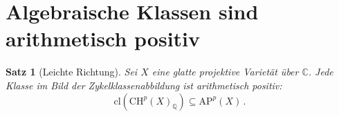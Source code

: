 \documentclass[aps,prd,twocolumn,superscriptaddress,nofootinbib]{revtex4-2}
\newtheorem{theorem}{Satz}[section]
\theoremstyle{definition}
\theoremstyle{remark}
\begin{document}
\section{Algebraische Klassen sind arithmetisch positiv}
\label{sec:easy_direction}

\begin{theorem}[Leichte Richtung]
\label{thm:easy_direction}
Sei $X$ eine glatte projektive Varietät über $\mathbb{C}$. Jede Klasse im Bild der Zykelklassenabbildung ist arithmetisch positiv:
\begin{equation}
\mathrm{cl}\!\left(\mathrm{CH}^p(X)_\mathbb{Q}\right) \subseteq \mathrm{AP}^p(X)\,.
\end{equation}
\end{theorem}
\end{document}
